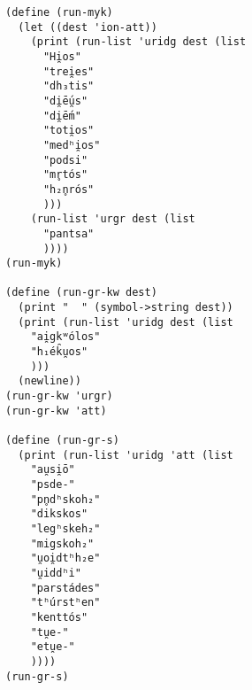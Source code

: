 \begin{verbatim}
(define (run-myk)
  (let ((dest 'ion-att))
    (print (run-list 'uridg dest (list
      "Hi̯os"
      "trei̯es"
      "dh₃tis"
      "di̯ḗu̯s"
      "di̯ḗm"
      "toti̯os"
      "medʰi̯os"
      "podsi"
      "mr̥tós"
      "h₂n̥rós"
      )))
    (run-list 'urgr dest (list
      "pantsa"
      ))))
(run-myk)

(define (run-gr-kw dest)
  (print "  " (symbol->string dest))
  (print (run-list 'uridg dest (list
    "ai̯gkʷólos"
    "h₁ék̑u̯os"
    )))
  (newline))
(run-gr-kw 'urgr)
(run-gr-kw 'att)

(define (run-gr-s)
  (print (run-list 'uridg 'att (list
    "au̯si̯ō"
    "psde-"
    "pn̥dʰskoh₂"
    "dikskos"
    "legʰskeh₂"
    "migskoh₂"
    "u̯oi̯dtʰh₂e"
    "u̯iddʰi"
    "parstádes"
    "tʰúrstʰen"
    "kenttós"
    "tu̯e-"
    "etu̯e-"
    ))))
(run-gr-s)

\end{verbatim}
